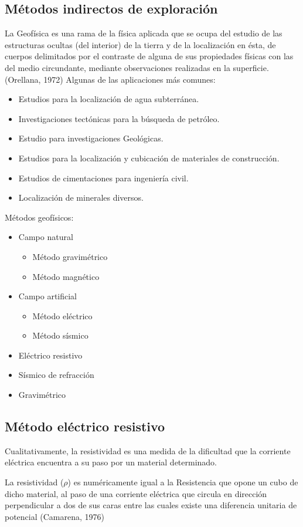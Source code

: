 \subsection{Métodos indirectos de exploración}
La Geofísica es una rama de la física aplicada que se
ocupa del estudio de las estructuras ocultas (del
interior) de la tierra y de la localización en ésta, de
cuerpos delimitados por el contraste de alguna de sus
propiedades físicas con las del medio circundante,
mediante observaciones realizadas en la superficie.
(Orellana, 1972)
Algunas de las aplicaciones más comunes:
\begin{itemize}
    \item Estudios para la localización de agua subterránea.
    \item Investigaciones tectónicas para la búsqueda de petróleo.
    \item Estudio para investigaciones Geológicas.
    \item Estudios para la localización y cubicación de materiales de construcción.
    \item Estudios de cimentaciones para ingeniería civil.
    \item Localización de minerales diversos.
\end{itemize}
Métodos geofísicos:
\begin{itemize}
    \item Campo natural \begin{itemize}
        \item Método gravimétrico
        \item Método magnético
    \end{itemize}
    \item Campo artificial \begin{itemize}
        \item Método eléctrico
        \item Método sísmico
    \end{itemize}
    \item Eléctrico resistivo
    \item Sísmico de refracción
    \item Gravimétrico
\end{itemize} 
\subsection{Método eléctrico resistivo}

\begin{definition}
    Cualitativamente, la resistividad es una medida de la dificultad que la corriente eléctrica encuentra a su paso por un material determinado.
    
    La resistividad ($\rho$) es numéricamente igual a la Resistencia que opone un cubo de dicho material, al paso de una corriente eléctrica que circula en dirección perpendicular a dos de sus caras entre las cuales existe una diferencia unitaria de potencial (Camarena, 1976)
\end{definition}

